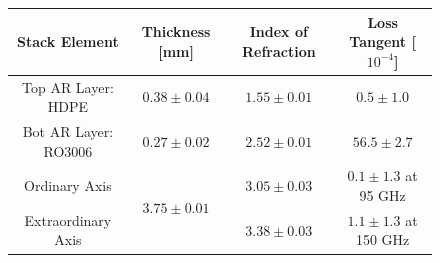 \begin{figure}[!t]
    \centering
    \vspace{0.2cm}
    \centering
    	\centering
	\begin{tabu}{| c | c | c | c |}
	\hline
	Stack Element & Thickness [mm] & Index of Refraction & Loss Tangent [$\mathrm{10^{-4}}$] \\
	\hline
	\hline
	Top AR Layer: HDPE & $0.38 \pm 0.04$ & $1.55 \pm 0.01$ & $0.5 \pm 1.0$ \\
	\hline
	Bot AR Layer: RO3006 & $0.27 \pm 0.02$ & $2.52 \pm 0.01$ & $56.5 \pm 2.7$ \\
	\hline
	Ordinary Axis &  & $3.05 \pm 0.03$ & $0.1 \pm 1.3$ at 95 GHz \\
	 
	Extraordinary Axis & & $3.38 \pm 0.03$ & $1.1 \pm 1.3$ at 150 GHz \\
	\hline
	\end{tabu}

\end{figure}

